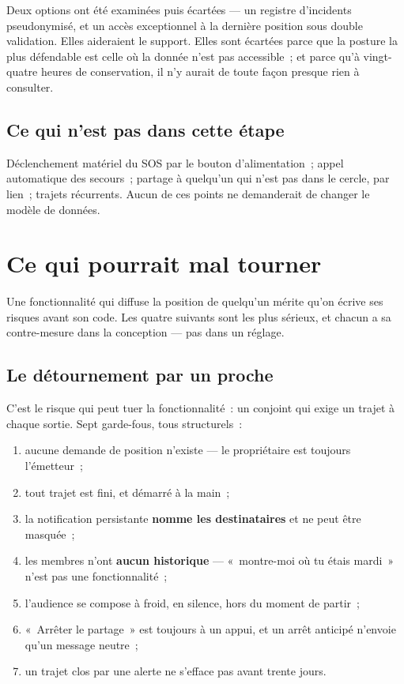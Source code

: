 Deux options ont été examinées puis écartées --- un registre d'incidents pseudonymisé, et un
accès exceptionnel à la dernière position sous double validation. Elles aideraient le
support. Elles sont écartées parce que la posture la plus défendable est celle où la donnée
n'est pas accessible~; et parce qu'à vingt-quatre heures de conservation, il n'y aurait de
toute façon presque rien à consulter.

\section{Ce qui n'est pas dans cette étape}

Déclenchement matériel du SOS par le bouton d'alimentation~; appel automatique des
secours~; partage à quelqu'un qui n'est pas dans le cercle, par lien~; trajets récurrents.
Aucun de ces points ne demanderait de changer le modèle de données.

\chapter{Ce qui pourrait mal tourner}

Une fonctionnalité qui diffuse la position de quelqu'un mérite qu'on écrive ses risques
avant son code. Les quatre suivants sont les plus sérieux, et chacun a sa contre-mesure dans
la conception --- pas dans un réglage.

\section{Le détournement par un proche}

C'est le risque qui peut tuer la fonctionnalité~: un conjoint qui exige un trajet à chaque
sortie. Sept garde-fous, tous structurels~:

\begin{enumerate}[leftmargin=1.6em]
  \item aucune demande de position n'existe --- le propriétaire est toujours l'émetteur~;
  \item tout trajet est fini, et démarré à la main~;
  \item la notification persistante \textbf{nomme les destinataires} et ne peut être
        masquée~;
  \item les membres n'ont \textbf{aucun historique} --- «~montre-moi où tu étais mardi~»
        n'est pas une fonctionnalité~;
  \item l'audience se compose à froid, en silence, hors du moment de partir~;
  \item «~Arrêter le partage~» est toujours à un appui, et un arrêt anticipé n'envoie qu'un
        message neutre~;
  \item un trajet clos par une alerte ne s'efface pas avant trente jours.
\end{enumerate}

